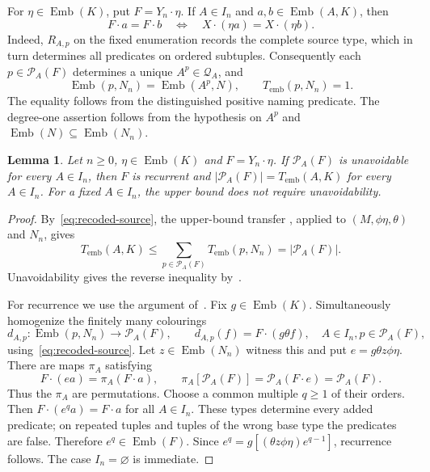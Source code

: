 \documentclass{article}
\numberwithin{equation}{section}
\newtheorem{lemma}[theorem]{Lemma}
\theoremstyle{definition}
\DeclareMathOperator{\Emb}{Emb}
\newcommand{\brd}{T_{\mathrm{emb}}}
\begin{document}
For $\eta\in\Emb(K)$, put $F=Y_n\cdot\eta$. If $A\in I_n$ and
$a,b\in\Emb(A,K)$, then
\begin{equation}\label{eq:source-type-identification}
F\cdot a=F\cdot b
\quad\Longleftrightarrow\quad
X\cdot(\eta a)=X\cdot(\eta b).
\end{equation}
Indeed, $R_{A,p}$ on the fixed enumeration records the complete source
type, which in turn determines all predicates on ordered subtuples.
Consequently each $p\in\mathcal P_A(F)$ determines a unique
$A^p\in\mathcal Q_A$, and
\begin{equation}\label{eq:recoded-source}
\Emb(p,N_n)=\Emb(A^p,N),\qquad \brd(p,N_n)=1.
\end{equation}
The equality follows from the distinguished positive naming predicate.
The degree-one assertion follows from the hypothesis on $A^p$ and
$\Emb(N)\subseteq\Emb(N_n)$.

\begin{lemma}\label{lem:finite-stage}
Let $n\geq0$, $\eta\in\Emb(K)$ and $F=Y_n\cdot\eta$.
If $\mathcal P_A(F)$ is unavoidable for every $A\in I_n$, then $F$ is
recurrent and $|\mathcal P_A(F)|=\brd(A,K)$ for every $A\in I_n$.
For a fixed $A\in I_n$, the upper bound does not require unavoidability.
\end{lemma}

\begin{proof}
By~\eqref{eq:recoded-source}, the upper-bound transfer
\cite[Theorem~3.10]{HZ}, applied to $(M,\phi\eta,\theta)$ and $N_n$,
gives
\[
\brd(A,K)\leq
\sum_{p\in\mathcal P_A(F)}\brd(p,N_n)=|\mathcal P_A(F)|.
\]
Unavoidability gives the reverse inequality by~\cite[Fact~3.4(1)]{HZ}.

For recurrence we use the argument of~\cite[proof of Theorem~3.18]{HZ}.
Fix $g\in\Emb(K)$. Simultaneously homogenize the finitely many colourings
\[
d_{A,p}:\Emb(p,N_n)\longrightarrow\mathcal P_A(F),\qquad
d_{A,p}(f)=F\cdot(g\theta f),
\quad A\in I_n, p\in\mathcal P_A(F),
\]
using~\eqref{eq:recoded-source}. Let $z\in\Emb(N_n)$ witness this and
put $e=g\theta z\phi\eta$. There are maps $\pi_A$ satisfying
\begin{equation}\label{eq:palette-permutation}
F\cdot(ea)=\pi_A(F\cdot a),\qquad
\pi_A[\mathcal P_A(F)]=\mathcal P_A(F\cdot e)=\mathcal P_A(F).
\end{equation}
Thus the $\pi_A$ are permutations. Choose a common multiple $q\geq1$
of their orders. Then $F\cdot(e^qa)=F\cdot a$ for all $A\in I_n$.
These types determine every added predicate; on repeated tuples and
tuples of the wrong base type the predicates are false. Therefore
$e^q\in\Emb(F)$. Since
$e^q=g[(\theta z\phi\eta)e^{q-1}]$, recurrence follows. The case
$I_n=\varnothing$ is immediate.
\end{proof}
\end{document}
